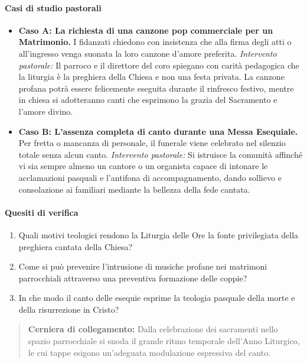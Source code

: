 \documentclass[12pt,a4paper]{article}
\begin{document}
	\paragraph{Casi di studio pastorali}\label{casi-di-studio-pastorali}
	
	\begin{itemize}[leftmargin=*]
		\item \textbf{Caso A: La richiesta di una canzone pop commerciale per un Matrimonio.} I fidanzati chiedono con insistenza che alla firma degli atti o all'ingresso venga suonata la loro canzone d'amore preferita. \emph{Intervento pastorale:} Il parroco e il direttore del coro spiegano con carità pedagogica che la liturgia è la preghiera della Chiesa e non una festa privata. La canzone profana potrà essere felicemente eseguita durante il rinfresco festivo, mentre in chiesa si adotteranno canti che esprimono la grazia del Sacramento e l'amore divino.
		\item \textbf{Caso B: L'assenza completa di canto durante una Messa Esequiale.} Per fretta o mancanza di personale, il funerale viene celebrato nel silenzio totale senza alcun canto. \emph{Intervento pastorale:} Si istruisce la comunità affinché vi sia sempre almeno un cantore o un organista capace di intonare le acclamazioni pasquali e l'antifona di accompagnamento, dando sollievo e consolazione ai familiari mediante la bellezza della fede cantata.
	\end{itemize}
	
	\paragraph{Quesiti di verifica}\label{quesiti-di-verifica}
	
	\begin{enumerate}[label=\arabic*.,leftmargin=*]
		\item Quali motivi teologici rendono la Liturgia delle Ore la fonte privilegiata della preghiera cantata della Chiesa?
		\item Come si può prevenire l'intrusione di musiche profane nei matrimoni parrocchiali attraverso una preventiva formazione delle coppie?
		\item In che modo il canto delle esequie esprime la teologia pasquale della morte e della risurrezione in Cristo?
	\end{enumerate}
	
	\begin{quote}
		\textbf{Cerniera di collegamento:} Dalla celebrazione dei sacramenti nello spazio parrocchiale si snoda il grande ritmo temporale dell'Anno Liturgico, le cui tappe esigono un'adeguata modulazione espressiva del canto.
	\end{quote}
	
\end{document}
